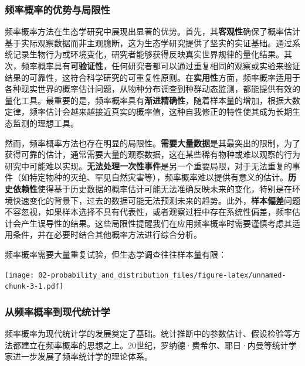 \documentclass[
  twoside]{book}
\begin{document}
\hypertarget{ux9891ux7387ux6982ux7387ux7684ux4f18ux52bfux4e0eux5c40ux9650ux6027}{%
\subsubsection{频率概率的优势与局限性}\label{ux9891ux7387ux6982ux7387ux7684ux4f18ux52bfux4e0eux5c40ux9650ux6027}}

频率概率方法在生态学研究中展现出显著的优势。首先，其\textbf{客观性}确保了概率估计基于实际观察数据而非主观臆断，这为生态学研究提供了坚实的实证基础。通过系统记录生物行为或环境变化，研究者能够获得反映真实世界规律的量化结果。其次，频率概率具有\textbf{可验证性}，任何研究者都可以通过重复相同的观察或实验来验证结果的可靠性，这符合科学研究的可重复性原则。在\textbf{实用性}方面，频率概率适用于各种现实世界的概率估计问题，从物种分布调查到种群动态监测，都能提供有效的量化工具。最重要的是，频率概率具有\textbf{渐进精确性}，随着样本量的增加，根据大数定律，频率估计会越来越接近真实的概率值，这种自我修正的特性使其成为长期生态监测的理想工具。

然而，频率概率方法也存在明显的局限性。\textbf{需要大量数据}是其最突出的限制，为了获得可靠的估计，通常需要大量的观察数据，这在某些稀有物种或难以观察的行为研究中可能难以实现。\textbf{无法处理一次性事件}是另一个重要局限，对于无法重复的事件（如特定物种的灭绝、罕见自然灾害等），频率概率难以提供有意义的估计。\textbf{历史依赖性}使得基于历史数据的概率估计可能无法准确反映未来的变化，特别是在环境快速变化的背景下，过去的数据可能无法预测未来的趋势。此外，\textbf{样本偏差}问题不容忽视，如果样本选择不具有代表性，或者观察过程中存在系统性偏差，频率估计会产生误导性的结果。这些局限性提醒我们在应用频率概率时需要谨慎考虑其适用条件，并在必要时结合其他概率方法进行综合分析。

频率概率需要大量重复试验，但生态学调查往往样本量有限：

\texttt{[image: 02-probability\_and\_distribution\_files/figure-latex/unnamed-chunk-3-1.pdf]}

\hypertarget{ux4eceux9891ux7387ux6982ux7387ux5230ux73b0ux4ee3ux7edfux8ba1ux5b66}{%
\subsubsection{从频率概率到现代统计学}\label{ux4eceux9891ux7387ux6982ux7387ux5230ux73b0ux4ee3ux7edfux8ba1ux5b66}}

频率概率为现代统计学的发展奠定了基础。统计推断中的参数估计、假设检验等方法都建立在频率概率的思想之上。20世纪，罗纳德·费希尔、耶日·内曼等统计学家进一步发展了频率统计学的理论体系。
\end{document}
